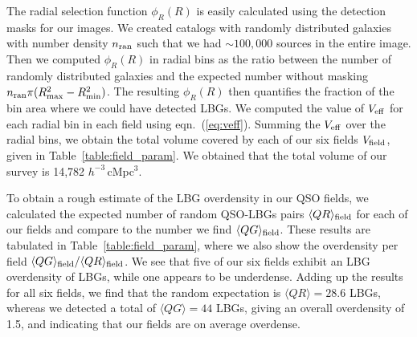 \documentclass[iop, revtex4]{emulateapj}
\begin{document}
The radial selection
function $\phi_{R}(R)$ is easily calculated using the detection masks for our images. We created catalogs
with randomly distributed galaxies with number density $n_{\rm ran}$ such that
we had $\sim 100,000$ sources in the entire image.
Then we computed $\phi_{R}(R)$ in radial bins as the ratio between the number of randomly distributed
galaxies and the expected number without masking $n_{\rm ran}\pi (R^{2}_{\rm max}-R^{2}_{\rm min})$.
The resulting $\phi_{R}(R)$ then quantifies the fraction of the bin area where we could have detected
LBGs. We computed the value of $V_{\rm eff}$ for each radial bin in each field using eqn.~(\ref{eq:veff}).
Summing the $V_{\rm eff}$ over the radial bins, we obtain the total volume covered by each of our six
fields $V_{\rm field}$, given in Table~\ref{table:field_param}. We obtained that the total volume of 
our survey is 14,782 $h^{-3}$\,cMpc$^{3}$.

To obtain a rough estimate of the LBG overdensity in our QSO fields, we calculated the expected
number of random QSO-LBGs pairs $\langle QR\rangle_{\rm field}$ for each of our fields and compare
to the number we find $\langle QG\rangle_{\rm field}$. These results are tabulated in
Table~\ref{table:field_param}, where we also show the overdensity per field $\langle QG\rangle_{\rm field}/\langle QR\rangle_{\rm field}$. We see that five of our six fields exhibit an LBG overdensity of LBGs, while
one appears to be underdense. Adding up the results for all six fields, we find that the
random expectation is $\langle QR\rangle=28.6$ LBGs, whereas we detected a total of $\langle QG\rangle = 44$
LBGs, giving an overall overdensity of 1.5, and indicating that our fields are on average overdense.
\end{document}
